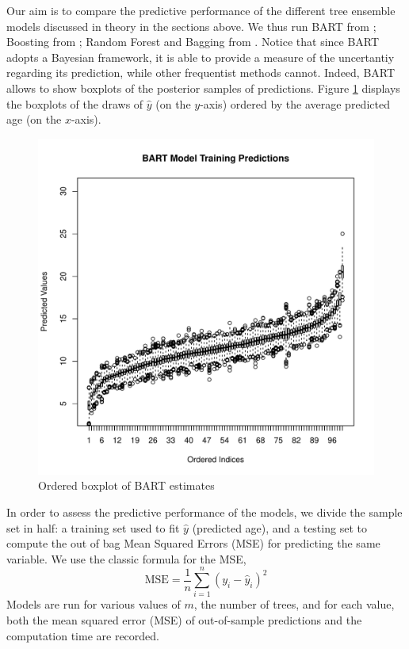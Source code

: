 \documentclass[a4paper,11pt]{article}
\begin{document}
Our aim is to compare the predictive performance of the different tree ensemble models discussed in theory in the sections above. We thus run BART from \cite{mccullochBARTBayesianAdditive2024}; Boosting from \cite{ridgewayGbmGeneralizedBoosted2024}; Random Forest and Bagging from \cite{breimanRandomForestBreimanCutlers2024}. 
Notice that since BART adopts a Bayesian framework, it is able to provide a measure of the uncertantiy regarding its prediction, while other frequentist methods cannot. Indeed, BART allows to show boxplots of the posterior samples of predictions. Figure \ref{fig:bart_box} displays the boxplots of the draws of $\hat{y}$ (on the $y$-axis) ordered by the average predicted age (on the $x$-axis).

\begin{figure}[h]
    \centering
    \includegraphics[width=0.7\linewidth]{outputs/bart_boxplot.pdf}
    \caption{Ordered boxplot of BART estimates}
    \label{fig:bart_box}
\end{figure}




In order to assess the predictive performance of the models, we divide the sample set in half: a training set used to fit  $\hat{y}$ (predicted age), and a testing set to compute the out of bag Mean Squared Errors (MSE) for predicting the same variable. We use the classic formula for the MSE, 
\[\text{MSE} = \frac{1}{n} \sum_{i=1}^{n} (y_i - \hat{y}_i)^2
\]
Models are run for various values of $m$, the number of trees, and for each value, both the mean squared error (MSE) of out-of-sample predictions and the computation time are recorded.
\end{document}
